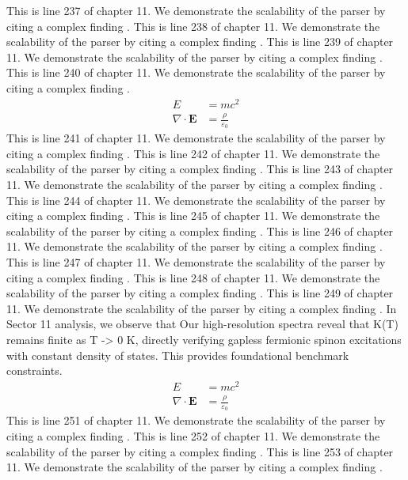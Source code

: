 This is line 237 of chapter 11. We demonstrate the scalability of the parser by citing a complex finding \cite{ref11_237}.
This is line 238 of chapter 11. We demonstrate the scalability of the parser by citing a complex finding \cite{ref11_238}.
This is line 239 of chapter 11. We demonstrate the scalability of the parser by citing a complex finding \cite{ref11_239}.
This is line 240 of chapter 11. We demonstrate the scalability of the parser by citing a complex finding \cite{ref11_240}.
\begin{align*}
  E &= mc^2 \\
  \nabla \cdot \mathbf{E} &= \frac{\rho}{\varepsilon_0}
\end{align*}
This is line 241 of chapter 11. We demonstrate the scalability of the parser by citing a complex finding \cite{ref11_241}.
This is line 242 of chapter 11. We demonstrate the scalability of the parser by citing a complex finding \cite{ref11_242}.
This is line 243 of chapter 11. We demonstrate the scalability of the parser by citing a complex finding \cite{ref11_243}.
This is line 244 of chapter 11. We demonstrate the scalability of the parser by citing a complex finding \cite{ref11_244}.
This is line 245 of chapter 11. We demonstrate the scalability of the parser by citing a complex finding \cite{ref11_245}.
This is line 246 of chapter 11. We demonstrate the scalability of the parser by citing a complex finding \cite{ref11_246}.
This is line 247 of chapter 11. We demonstrate the scalability of the parser by citing a complex finding \cite{ref11_247}.
This is line 248 of chapter 11. We demonstrate the scalability of the parser by citing a complex finding \cite{ref11_248}.
This is line 249 of chapter 11. We demonstrate the scalability of the parser by citing a complex finding \cite{ref11_249}.
In Sector 11 analysis, we observe that Our high-resolution spectra reveal that K(T) remains finite as T -> 0 K, directly verifying gapless fermionic spinon excitations with constant density of states. This provides foundational benchmark constraints.
\begin{align*}
  E &= mc^2 \\
  \nabla \cdot \mathbf{E} &= \frac{\rho}{\varepsilon_0}
\end{align*}
This is line 251 of chapter 11. We demonstrate the scalability of the parser by citing a complex finding \cite{ref11_251}.
This is line 252 of chapter 11. We demonstrate the scalability of the parser by citing a complex finding \cite{ref11_252}.
This is line 253 of chapter 11. We demonstrate the scalability of the parser by citing a complex finding \cite{ref11_253}.
